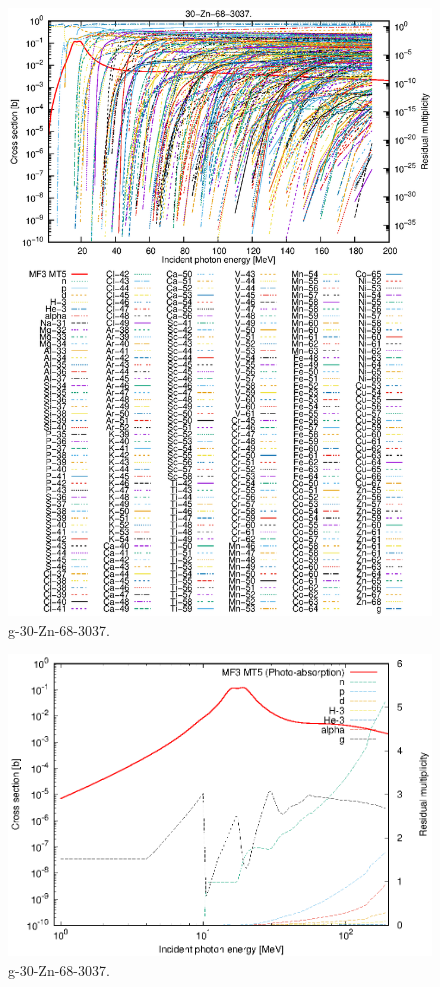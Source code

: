 \begin{figure}
 \includegraphics[width=\linewidth]{eps/g_30-Zn-68_3037.eps}
  \caption{g-30-Zn-68-3037.}
\end{figure}
\newpage \clearpage

\begin{figure}
 \includegraphics[width=\linewidth]{eps-log/g_30-Zn-68_3037.eps}
 \caption{g-30-Zn-68-3037.}
\end{figure}
\newpage \clearpage


